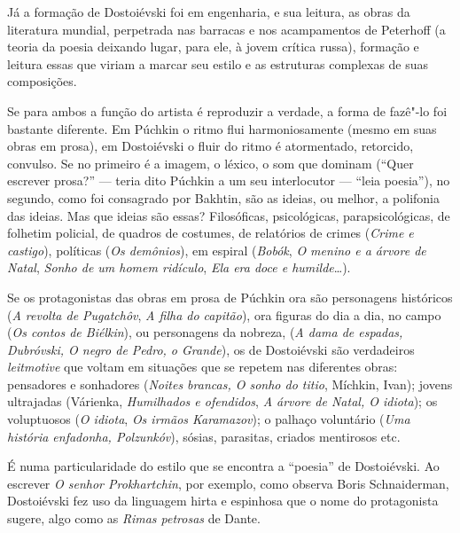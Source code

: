 Já a formação de Dostoiévski foi em engenharia, e sua leitura, as obras
da literatura mundial, perpetrada nas barracas e nos acampamentos de
Peterhoff (a teoria da poesia deixando lugar, para ele, à jovem crítica
russa), formação e leitura essas que viriam a marcar seu estilo e as
estruturas complexas de suas composições.

Se para ambos a função do artista é reproduzir a verdade, a forma de
fazê"-lo foi bastante diferente. Em Púchkin o ritmo flui harmoniosamente
(mesmo em suas obras em prosa), em Dostoiévski o fluir do ritmo é
atormentado, retorcido, convulso. Se no primeiro é a imagem, o léxico, o
som que dominam (``Quer escrever prosa?'' --- teria dito Púchkin a um seu
interlocutor --- ``leia poesia''), no segundo, como foi consagrado por
Bakhtin, são as ideias, ou melhor, a polifonia das ideias. Mas que ideias
são essas? Filosóficas, psicológicas, parapsicológicas, de folhetim
policial, de quadros de costumes, de relatórios de crimes (\emph{Crime e
castigo}), políticas (\emph{Os demônios}), em espiral (\emph{Bobók}, \emph{O menino e a árvore de Natal}, \emph{Sonho de um homem ridículo},
\emph{Ela era doce e humilde}\ldots{}).

Se os protagonistas das obras em prosa de Púchkin ora são personagens
históricos (\emph{A revolta de Pugatchôv}, \emph{A filha do capitão}),
ora figuras do dia a dia, no campo (\emph{Os contos de
Biélkin}), ou personagens da nobreza, (\emph{A dama de espadas,
Dubróvski, O negro de Pedro, o Grande}), os de Dostoiévski são
verdadeiros \emph{leitmotive} que voltam em situações que se repetem nas
diferentes obras: pensadores e sonhadores (\emph{Noites brancas, O
sonho do titio}, Míchkin, Ivan); jovens ultrajadas (Várienka,
\emph{Humilhados e ofendidos}, \emph{A árvore de Natal, O idiota}); os
voluptuosos (\emph{O idiota}, \emph{Os irmãos Karamazov}); o palhaço
voluntário (\emph{Uma história enfadonha, Polzunkóv}), sósias,
parasitas, criados mentirosos etc.

É numa particularidade do estilo que se encontra a ``poesia'' de
Dostoiévski. Ao escrever \emph{O senhor Prokhartchin}, por exemplo, como
observa Boris Schnaiderman, Dostoiévski fez uso da linguagem hirta e
espinhosa que o nome do protagonista sugere, algo como as \emph{Rimas
petrosas} de Dante.


